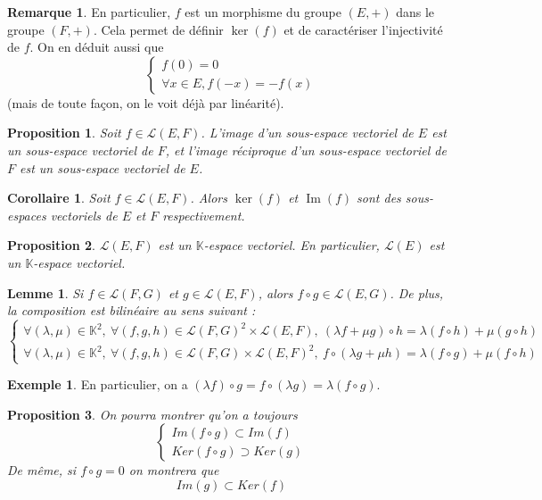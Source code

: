 \documentclass[french]{book}
\theoremstyle{plain}
\newtheorem{lem}{Lemme}[chapter]
\newtheorem{prop}{Proposition}[chapter]
\newtheorem{cor}{Corollaire}[chapter]
\theoremstyle{definition}
\newtheorem{exa}{Exemple}[chapter]
\newtheorem{rmq}{Remarque}[chapter]
\theoremstyle{remark}
\DeclareMathOperator{\im}{Im}
\begin{document}
\begin{rmq}
En particulier, $f$ est un morphisme du groupe $(E,+)$ dans le groupe $(F,+)$. Cela permet de définir $\ker(f)$ et de caractériser l'injectivité de $f$. On en déduit aussi que $$\begin{cases}
	f(0) = 0 \\
	\forall x \in E, f(-x) = -f(x)
\end{cases}$$
(mais de toute façon, on le voit déjà par linéarité).
\end{rmq}
\begin{prop}
Soit $f \in \mathcal{L}(E, F)$. L'image d'un sous-espace vectoriel de $E$ est un sous-espace vectoriel de $F$, et l'image réciproque d'un sous-espace vectoriel de $F$ est un sous-espace vectoriel de $E$.
\end{prop}
\begin{cor}
Soit $f \in \mathcal{L}(E, F)$. Alors $\ker(f)$ et $\im(f)$ sont des sous-espaces vectoriels de $E$ et $F$ respectivement.
\end{cor}
\begin{prop}
$\mathcal{L}(E, F)$ est un $\mathbb{K}$-espace vectoriel. En particulier, $\mathcal{L}(E)$ est un $\mathbb{K}$-espace vectoriel.
\end{prop}
\begin{lem}
Si $f \in \mathcal{L}(F, G)$ et $g \in \mathcal{L}(E, F)$, alors $f \circ g \in \mathcal{L}(E, G)$. De plus, la composition est bilinéaire au sens suivant : $$\begin{cases}
	\forall (\lambda, \mu) \in \mathbb{K}^2,\ \forall (f, g, h) \in \mathcal{L}(F, G)^2 \times \mathcal{L}(E, F),\ (\lambda f + \mu g) \circ h = \lambda (f \circ h) + \mu (g \circ h) \\ \forall (\lambda, \mu) \in \mathbb{K}^2,\ \forall (f, g, h) \in \mathcal{L}(F, G)\times\mathcal{L}(E,F)^2,\ f \circ (\lambda g + \mu h) = \lambda (f \circ g) + \mu (f \circ h)
\end{cases}$$
\end{lem}
\begin{exa}
	En particulier, on a $(\lambda f) \circ g = f \circ (\lambda g) = \lambda(f \circ g)$.
\end{exa}
\begin{prop}
	On pourra montrer qu'on a toujours 
	$$\begin{cases}
	Im(f \circ g) \subset Im(f) \\
	Ker(f \circ g) \supset Ker(g)
	\end{cases}$$
De même, si $f \circ g = 0$ on montrera que
$$Im(g) \subset Ker(f)$$
\end{prop}
\end{document}
